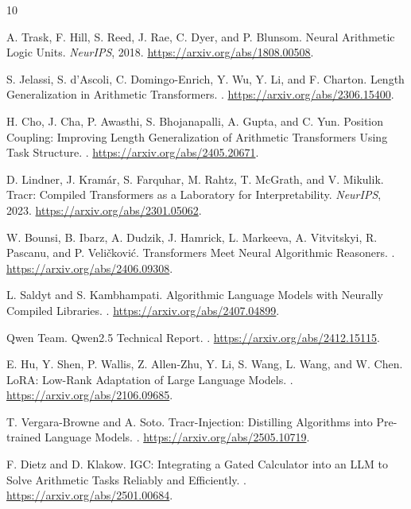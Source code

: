 \documentclass[11pt]{article}
\begin{document}
\begin{thebibliography}{10}

A. Trask, F. Hill, S. Reed, J. Rae, C. Dyer, and P. Blunsom.
\newblock Neural Arithmetic Logic Units.
\newblock \emph{NeurIPS}, 2018.
\newblock \url{https://arxiv.org/abs/1808.00508}.

S. Jelassi, S. d'Ascoli, C. Domingo-Enrich, Y. Wu, Y. Li, and F. Charton.
\newblock Length Generalization in Arithmetic Transformers.
.
\newblock \url{https://arxiv.org/abs/2306.15400}.

H. Cho, J. Cha, P. Awasthi, S. Bhojanapalli, A. Gupta, and C. Yun.
\newblock Position Coupling: Improving Length Generalization of Arithmetic
Transformers Using Task Structure.
.
\newblock \url{https://arxiv.org/abs/2405.20671}.

D. Lindner, J. Kram\'{a}r, S. Farquhar, M. Rahtz, T. McGrath, and V. Mikulik.
\newblock Tracr: Compiled Transformers as a Laboratory for Interpretability.
\newblock \emph{NeurIPS}, 2023.
\newblock \url{https://arxiv.org/abs/2301.05062}.

W. Bounsi, B. Ibarz, A. Dudzik, J. Hamrick, L. Markeeva, A. Vitvitskyi,
R. Pascanu, and P. Veli\v{c}kovi\'{c}.
\newblock Transformers Meet Neural Algorithmic Reasoners.
.
\newblock \url{https://arxiv.org/abs/2406.09308}.

L. Saldyt and S. Kambhampati.
\newblock Algorithmic Language Models with Neurally Compiled Libraries.
.
\newblock \url{https://arxiv.org/abs/2407.04899}.

Qwen Team.
\newblock Qwen2.5 Technical Report.
.
\newblock \url{https://arxiv.org/abs/2412.15115}.

E. Hu, Y. Shen, P. Wallis, Z. Allen-Zhu, Y. Li, S. Wang, L. Wang, and W. Chen.
\newblock LoRA: Low-Rank Adaptation of Large Language Models.
.
\newblock \url{https://arxiv.org/abs/2106.09685}.

T. Vergara-Browne and A. Soto.
\newblock Tracr-Injection: Distilling Algorithms into Pre-trained Language
Models.
.
\newblock \url{https://arxiv.org/abs/2505.10719}.

F. Dietz and D. Klakow.
\newblock IGC: Integrating a Gated Calculator into an LLM to Solve Arithmetic
Tasks Reliably and Efficiently.
.
\newblock \url{https://arxiv.org/abs/2501.00684}.

\end{thebibliography}
\end{document}
